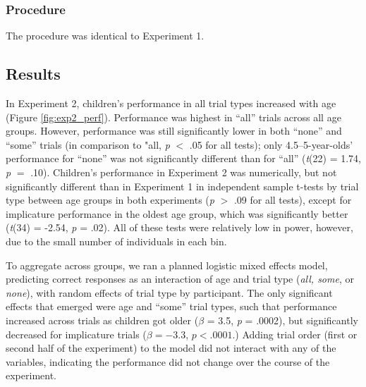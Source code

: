 \documentclass[man]{apa2}
\begin{document}
\subsubsection{Procedure}
The procedure was identical to Experiment 1.

\subsection{Results}

In Experiment 2, children's performance in all trial types increased with age (Figure \ref{fig:exp2_perf}). Performance was highest in ``all'' trials across all age groups. However, performance was still significantly lower in both ``none'' and ``some'' trials (in comparison to "all, \emph{p} $<$ .05 for all tests); only 4.5--5-year-olds' performance for ``none'' was not significantly different than for ``all'' (\emph{t}(22) = 1.74, \emph{p} $=$ .10). Children's performance in Experiment 2 was numerically, but not significantly different than in Experiment 1 in independent sample t-tests by trial type between age groups in both experiments (\emph{p} $>$ .09 for all tests), except for implicature performance in the oldest age group, which was significantly better (\emph{t}(34) = -2.54, \emph{p} = .02). All of these tests were relatively low in power, however, due to the small number of individuals in each bin.



To aggregate across groups, we ran a planned logistic mixed effects model, predicting correct responses as an interaction of age and trial type (\textit{all, some}, or \textit{none}), with random effects of trial type by participant. The only significant effects that emerged were age and ``some'' trial types, such that performance increased across trials as children got older ($\beta$ = 3.5, \textit{p} =  .0002), but significantly decreased for implicature trials ($\beta = -3.3$, $p < .0001$.) Adding trial order (first or second half of the experiment) to the model did not interact with any of the variables, indicating the performance did not change over the course of the experiment.
\end{document}
